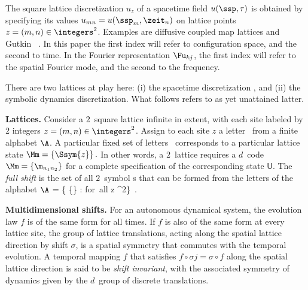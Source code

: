 


\renewcommand{\shift}{\ensuremath{\sigma}}
\renewcommand{\Xx}{\ensuremath{\mathsf{U}}}

The square lattice discretization $u_z$ of a spacetime field $u(\ssp,\tau)$ is
obtained by
specifying its values $u_{mn}= u(\ssp_m, \zeit_n)$ on lattice points $z=(m,n)
\in \integers^2$. Examples are diffusive coupled map
lattices and Gutkin \etal\ \catlatt{}.
In this paper the first index will refer to configuration space, and the second to time.
In the Fourier representation $\Fu_{kj}$, the first index will refer to the spatial
Fourier mode, and the second to the frequency.

There are two lattices at play here: (i) the spacetime discretization
, and (ii) the symbolic dynamics discretization. What follows refers
to as yet unattained latter.

{\bf Lattices.}
Consider a $2$\dmn\ square lattice infinite in extent, with each site
labeled by $2$ integers $z=(m,n)\in \integers^{2}$. Assign to each site $z$ a
letter \ from a finite alphabet $\A$. A particular fixed set
of letters  \ corresponds to a particular lattice state
\(
\Mm= \{\Ssym{z}\} %
\,.
\)
In other words, a $2$\dmn\ lattice requires a {$d$\dmn\ code}
\(
\Mm = \{\m_{n_1 n_2}\}
\)
for a complete specification of the corresponding state $\Xx$.
The {\em full shift} is the set of all $2$\dmn\
symbol \brick s that can be formed from the letters of the alphabet $\A$
\beq
\hat{\AdmItnr} = \{ \{\} %
              : \Ssym{z} \in \A \quad \mbox{for all} \quad z \in  \integers^2\}
\,.

{\bf Multidimensional shifts.}
For an autonomous dynamical system, the evolution law $f$ is of the same form for all times.
If $f$ is also of the same form at every lattice site, the
group of lattice translations, acting along the spatial lattice direction by
shift \shift{}, is a spatial symmetry that commutes with the temporal
evolution. A temporal mapping $f$ that satisfies
$f\circ\shift{j}=\shift{}\circ{f}$ along the spatial lattice
direction is said to be {\em shift invariant}, with the associated
symmetry of dynamics given by the $d$\dmn\ group of discrete
{\spt} translations.

